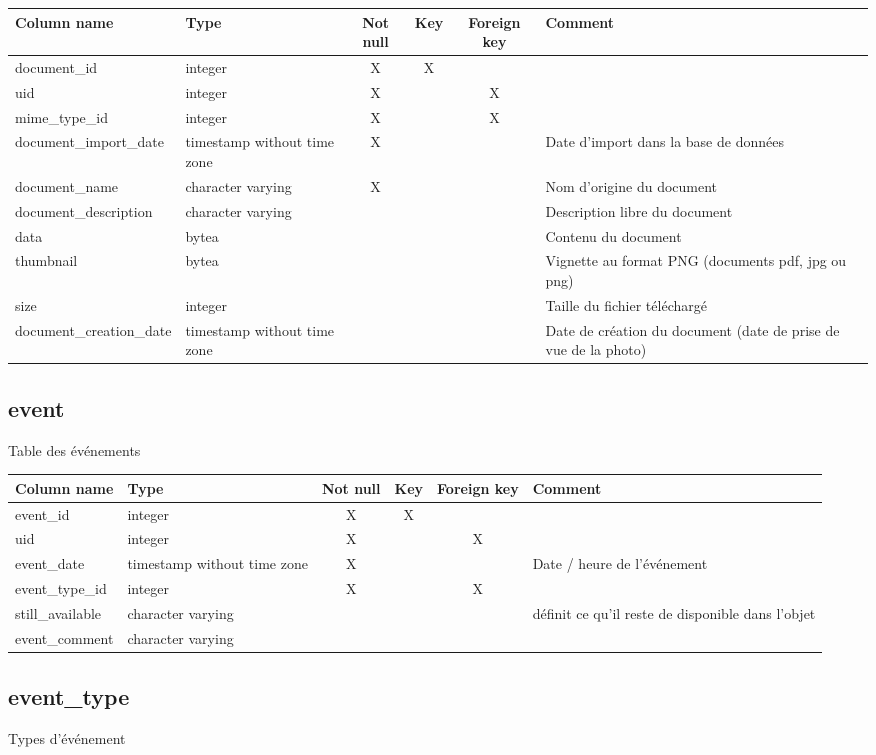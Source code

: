 \begin{tabular}{|l| p{2cm}|c|c|c| p{3cm}|}
\hline
Column name & Type & Not null & Key & Foreign key & Comment \\
\hline
document\_id & integer & X & X & & \\
\hline
uid & integer & X & & X & \\
\hline
mime\_type\_id & integer & X & & X & \\
\hline
document\_import\_date & timestamp without time zone & X & & & Date d'import dans la base de données\\
\hline
document\_name & character varying & X & & & Nom d'origine du document\\
\hline
document\_description & character varying & & & & Description libre du document\\
\hline
data & bytea & & & & Contenu du document\\
\hline
thumbnail & bytea & & & & Vignette au format PNG (documents pdf, jpg ou png)\\
\hline
size & integer & & & & Taille du fichier téléchargé\\
\hline
document\_creation\_date & timestamp without time zone & & & & Date de création du document (date de prise de vue de la photo)\\
\hline
\end{tabular}
\subsection{event}
Table des événements

\begin{tabular}{|l| p{2cm}|c|c|c| p{3cm}|}
\hline
Column name & Type & Not null & Key & Foreign key & Comment \\
\hline
event\_id & integer & X & X & & \\
\hline
uid & integer & X & & X & \\
\hline
event\_date & timestamp without time zone & X & & & Date / heure de l'événement\\
\hline
event\_type\_id & integer & X & & X & \\
\hline
still\_available & character varying & & & & définit ce qu'il reste de disponible dans l'objet\\
\hline
event\_comment & character varying & & & & \\
\hline
\end{tabular}
\subsection{event\_type}
Types d'événement

